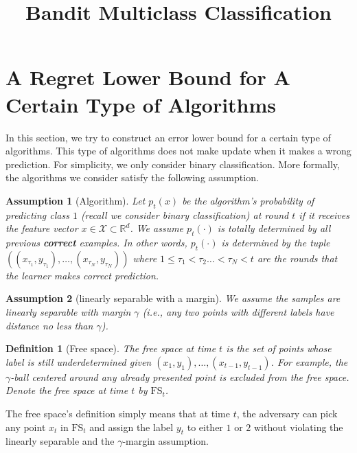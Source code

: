 \documentclass{article}
\title{Bandit Multiclass Classification}
\newcommand{\FS}{\text{FS}}
\newcommand{\calX}{{\mathcal{X}}}
\newtheorem{assumption}{Assumption}
\newtheorem{definition}[theorem]{Definition}
\begin{document}

\maketitle
	

\section{A Regret Lower Bound for A Certain Type of Algorithms}
In this section, we try to construct an error lower bound for a certain type of algorithms. This type of algorithms does not make update when it makes a wrong prediction. For simplicity, we only consider binary classification.  More formally, the algorithms we consider satisfy the following assumption. 

\begin{assumption}[Algorithm]
Let $p_t(x)$ be the algorithm's probability of predicting class $1$ (recall we consider binary classification) at round $t$ if it receives the feature vector $x\in \calX \subset \mathbb{R}^d$. We assume $p_t(\cdot)$ is totally determined by all previous \textbf{correct} examples. In other words, $p_t(\cdot)$ is determined by the tuple $((x_{\tau_1}, y_{\tau_1}), \ldots, (x_{\tau_N}, y_{\tau_N}))$ where $1\leq \tau_1 < \tau_2 \ldots < \tau_N < t$ are the rounds that the learner makes correct prediction. 
\end{assumption}

\begin{assumption}[linearly separable with a margin]
We assume the samples are linearly separable with margin $\gamma$ (i.e., any two points with different labels have distance no less than $\gamma$). 
\end{assumption}

\begin{definition}[Free space]
The free space at time $t$ is the set of points whose label is still underdetermined given $(x_1, y_1), \ldots, (x_{t-1},y_{t-1})$. For example, the $\gamma$-ball centered around any already presented point is excluded from the free space. Denote the free space at time $t$ by $\FS_t$.  
\end{definition}
The free space's definition simply means that at time $t$, the adversary can pick any point $x_t$ in $\FS_t$ and assign the label $y_t$ to either $1$ or $2$ without violating the linearly separable and the $\gamma$-margin assumption. 
\end{document}
